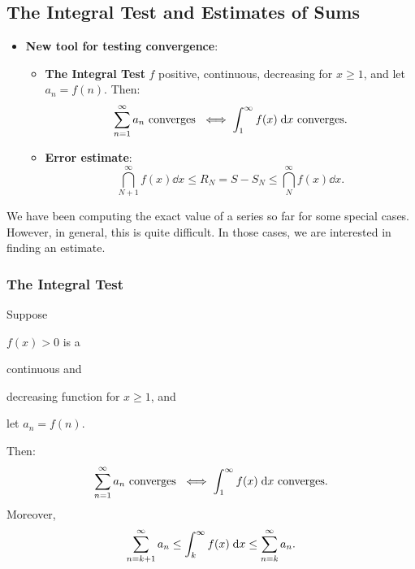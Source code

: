 \subsection{The Integral Test and Estimates of Sums} 
\begin{center}
\begin{tcolorbox}
    \begin{itemize}
        \item \textbf{New tool for testing convergence}: 
        \begin{itemize}
            \item \textbf{The Integral Test}
            $f$ positive, continuous, decreasing for $x \geq 1$, and let $a_n = f(n)$. Then:
            \[\displaystyle\sum_{n=1}^\infty a_n \text{ converges } \iff \displaystyle\int_1^\infty f(x) \;\mathrm{d} x \text{ converges.}\]
            
            \item \textbf{Error estimate}: 
            \[\dint_{N+1}^\infty f(x) \dd x \leq R_N = S - S_N \leq \dint_{N}^\infty f(x) \dd x.\]
        \end{itemize}
    \end{itemize}
\end{tcolorbox}
\end{center}

We have been computing the exact value of a series so far for some special cases. However, in general, this is quite difficult. In those cases, we are interested in finding an estimate.

\subsubsection{The Integral Test}
\begin{thm}
    Suppose \begin{enumerate*}[label = \circled{\arabic*}]
        \item $f(x) > 0$ is a  \item continuous and \item decreasing function for $x \geq 1$, and 
        \item let $a_n = f(n)$. 
    \end{enumerate*} Then: 
    \[\displaystyle\sum_{n=1}^\infty a_n \text{ converges } \iff \displaystyle\int_1^\infty f(x) \;\mathrm{d} x \text{ converges.}\]
    Moreover,
    \[\displaystyle\sum_{n=k+1}^\infty a_n \leq \displaystyle\int_k^\infty f(x) \;\mathrm{d} x \leq \displaystyle\sum_{n=k}^\infty a_n.\]
\end{thm}

